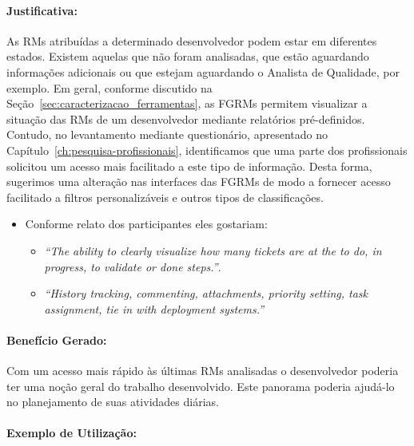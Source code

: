 
\paragraph{Justificativa:}
\label{par:justificativa_s04}

As RMs atribuídas a determinado desenvolvedor podem estar em diferentes estados.
Existem aquelas que não foram analisadas, que estão aguardando informações
adicionais ou que estejam aguardando o Analista de Qualidade, por exemplo. Em
geral, conforme discutido na Seção~\ref{sec:caracterizacao_ferramentas}, as
FGRMs permitem visualizar a situação das RMs de um desenvolvedor mediante
relatórios pré-definidos. Contudo, no levantamento mediante questionário,
apresentado no Capítulo~\ref{ch:pesquisa-profissionais}, identificamos que uma
parte dos profissionais solicitou um acesso mais facilitado a este tipo de
informação. Desta forma, sugerimos uma alteração nas interfaces das FGRMs de
modo a fornecer acesso facilitado a filtros personalizáveis e outros tipos de
classificações.

\begin{itemize}
	\item Conforme relato dos participantes eles gostariam:
	\begin{itemize}
		\item \textit{``The ability to clearly visualize how many tickets are at
				the to do, in progress, to validate or done steps.''}.
		\item \textit{``History tracking, commenting, attachments, priority
				setting, task assignment, tie in with deployment systems.''}
	\end{itemize}
\end{itemize}

\paragraph{Benefício Gerado:}
\label{par:papéis_afetados_s04}

Com um acesso mais rápido às últimas RMs analisadas o desenvolvedor poderia ter
uma noção geral do trabalho desenvolvido. Este panorama poderia ajudá-lo no
planejamento de suas atividades diárias.

\paragraph{Exemplo de Utilização:}
\label{par:exemplo_de_utilização_s04}

